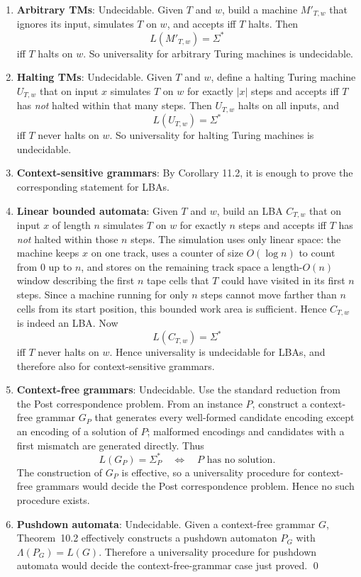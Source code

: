 \begin{enumerate}[{12.}1. ]
\begin{enumerate}
\item \textbf{Arbitrary TMs}: Undecidable. Given $T$ and $w$, build a machine
$M'_{T,w}$ that ignores its input, simulates $T$ on $w$, and accepts iff $T$
halts. Then
\[
L(M'_{T,w})=\Sigma^*
\]
iff $T$ halts on $w$. So universality for arbitrary Turing machines is
undecidable.
\item \textbf{Halting TMs}: Undecidable. Given $T$ and $w$, define a halting
Turing machine $U_{T,w}$ that on input $x$ simulates $T$ on $w$ for exactly
$|x|$ steps and accepts iff $T$ has \emph{not} halted within that many steps.
Then $U_{T,w}$ halts on all inputs, and
\[
L(U_{T,w})=\Sigma^*
\]
iff $T$ never halts on $w$. So universality for halting Turing machines is
undecidable.
\item \textbf{Context-sensitive grammars}: By Corollary 11.2, it is enough to
prove the corresponding statement for LBAs.
\item \textbf{Linear bounded automata}: Given $T$ and $w$, build an LBA
$C_{T,w}$ that on input $x$ of length $n$ simulates $T$ on $w$ for exactly $n$
steps and accepts iff $T$ has \emph{not} halted within those $n$ steps. The
simulation uses only linear space: the machine keeps $x$ on one track, uses a
counter of size $O(\log n)$ to count from $0$ up to $n$, and stores on the
remaining track space a length-$O(n)$ window describing the first $n$ tape cells
that $T$ could have visited in its first $n$ steps. Since a machine running for
only $n$ steps cannot move farther than $n$ cells from its start position, this
bounded work area is sufficient. Hence $C_{T,w}$ is indeed an LBA.
Now
\[
L(C_{T,w})=\Sigma^*
\]
iff $T$ never halts on $w$. Hence universality is undecidable for LBAs, and
therefore also for context-sensitive grammars.
\item \textbf{Context-free grammars}: Undecidable. Use the standard reduction
from the Post correspondence problem. From an instance $P$, construct a
context-free grammar $G_P$ that generates every well-formed candidate encoding
except an encoding of a solution of $P$; malformed encodings and candidates
with a first mismatch are generated directly. Thus
\[
L(G_P)=\Sigma_P^*
\quad\Longleftrightarrow\quad
P\text{ has no solution}.
\]
The construction of $G_P$ is effective, so a universality procedure for
context-free grammars would decide the Post correspondence problem. Hence no
such procedure exists.
\item \textbf{Pushdown automata}: Undecidable. Given a context-free grammar
$G$, Theorem~10.2 effectively constructs a pushdown automaton $P_G$
with $\Lambda(P_G)=L(G)$. Therefore a universality procedure for pushdown
automata would decide the context-free-grammar case just proved. \qed
\end{enumerate}


\end{enumerate}
